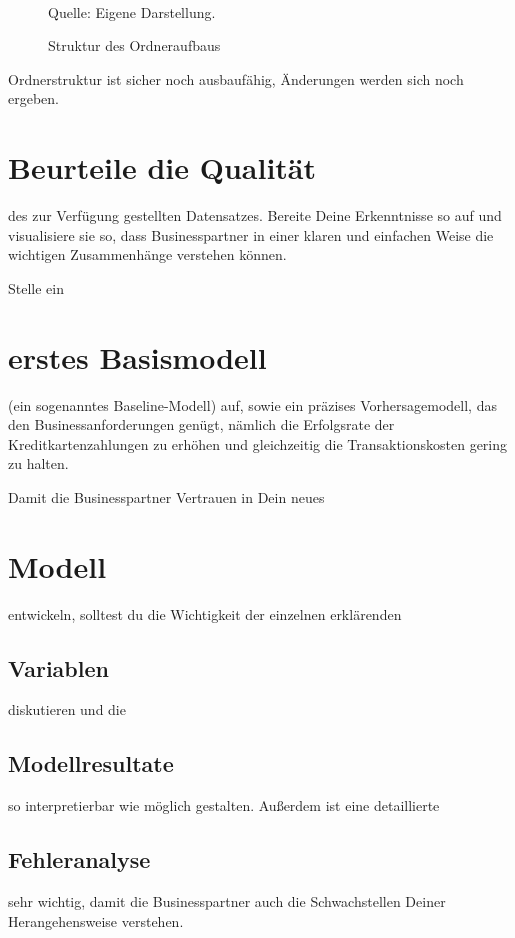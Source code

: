 
\begin{figure}[h]
\caption{Struktur des Ordneraufbaus}
\begin{tabular}{c}  %

\end{tabular}\\
\centering
Quelle: Eigene Darstellung.
\label{tab:structure}
\end{figure}

Ordnerstruktur ist sicher noch ausbaufähig, Änderungen werden sich noch ergeben. 





\section{Beurteile die Qualität} des zur Verfügung gestellten Datensatzes. Bereite Deine Erkenntnisse so auf und visualisiere sie so, dass Businesspartner in einer klaren und einfachen Weise die wichtigen Zusammenhänge verstehen können.

Stelle ein \section{erstes Basismodell} (ein sogenanntes Baseline-Modell) auf, sowie ein präzises Vorhersagemodell, das den Businessanforderungen genügt, nämlich die Erfolgsrate der Kreditkartenzahlungen zu erhöhen und gleichzeitig die Transaktionskosten gering zu halten.

Damit die Businesspartner Vertrauen in Dein neues \section{Modell} entwickeln, solltest du die Wichtigkeit der einzelnen erklärenden \subsection{Variablen} diskutieren und die \subsection{Modellresultate} so interpretierbar wie möglich gestalten. Außerdem ist eine detaillierte \subsection{Fehleranalyse} sehr wichtig, damit die Businesspartner auch die Schwachstellen Deiner Herangehensweise verstehen.

